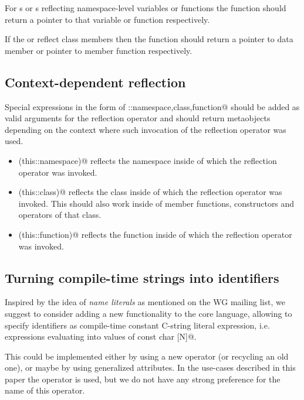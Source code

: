 For s or s reflecting namespace-level variables or functions
the \verb@get@ function should return a pointer to that variable or function respectively.

If the  or  reflect class members then the \verb@get@ function
should return a pointer to data member or pointer to member function respectively.

\subsection{Context-dependent reflection}
\label{appendix-context-dependent-reflection}

Special expressions in the form of \verb@this::{namespace,class,function}@ should be added
as valid arguments for the reflection operator and should return metaobjects depending
on the context where such invocation of the reflection operator was used.

\begin{itemize}
\item{\verb@mirrored(this::namespace)@} reflects the namespace inside of which the reflection
operator was invoked.
\item{\verb@mirrored(this::class)@} reflects the class inside of which the reflection
operator was invoked. This should also work inside of member functions, constructors and operators
of that class.
\item{\verb@mirrored(this::function)@} reflects the function inside of which the reflection
operator was invoked.
\end{itemize}

\subsection{Turning compile-time strings into identifiers}
\label{appendix-operator-identifier}

Inspired by the idea of {\em name literals} as mentioned on the WG mailing list,
we suggest to consider adding a new functionality to the core language, allowing to specify
identifiers as compile-time constant C-string literal expression, i.e. expressions
evaluating into values of \verb@constexpr const char [N]@.

This could be implemented either by using a new operator (or recycling an old one),
or maybe by using generalized attributes.
In the use-cases described in this paper the \verb@identifier@ operator is used, but we do not have
any strong preference for the name of this operator.

